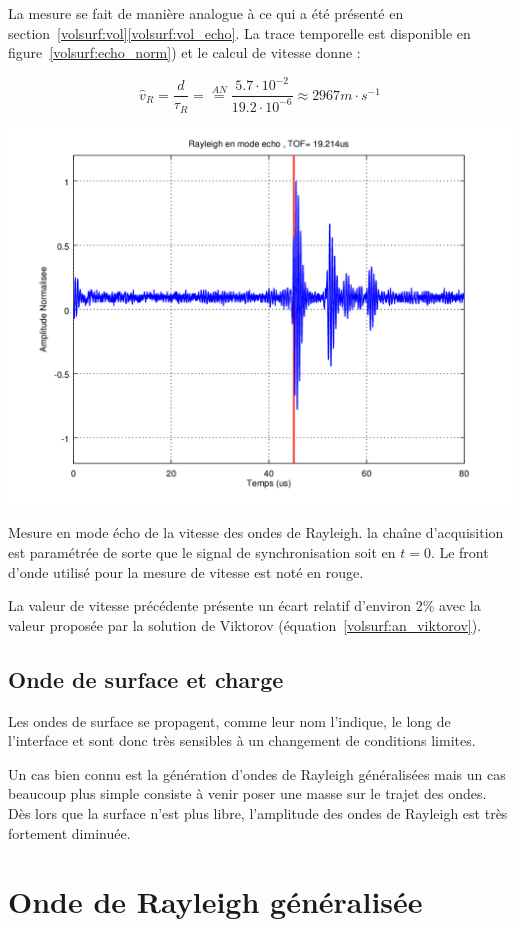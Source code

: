 La mesure se fait de manière analogue à ce qui a été présenté en section~\ref{volsurf:vol}\ref{volsurf:vol_echo}. La trace temporelle est disponible en figure~\ref{volsurf:echo_norm}) et le calcul de vitesse donne :

\begin{equation}
    \hat{v}_R  = \frac{d}{\tau_R} = \overset{AN}{=} \frac{5.7\cdot10^{-2}}{19.2\cdot10^{-6}} \approx 2967m\cdot s^{-1}
\end{equation}

\begin{figurehere}
    \centering
    \includegraphics[width=.5\textwidth]{volsurf_figs/DS0008_rayleigh_echo.png}
    \caption{Mesure en mode écho de la vitesse des ondes de Rayleigh. la chaîne d'acquisition est paramétrée de sorte que le signal de synchronisation soit en $t=0$. Le front d'onde utilisé pour la mesure de vitesse est noté en rouge.}
    \label{volsurf:echo_norm}
\end{figurehere}

La valeur de vitesse précédente présente un écart relatif d'environ 2\% avec la valeur proposée par la solution de Viktorov (équation~\eqref{volsurf:an_viktorov}).

\subsection{Onde de surface et charge}

Les ondes de surface se propagent, comme leur nom l'indique, le long de l'interface et sont donc très sensibles à un changement de conditions limites.

Un cas bien connu est la génération d'ondes de Rayleigh généralisées mais un cas beaucoup plus simple consiste à venir poser une masse sur le trajet des ondes. Dès lors que la surface n'est plus libre, l'amplitude des ondes de Rayleigh est très fortement diminuée.

\section{Onde de Rayleigh généralisée}

